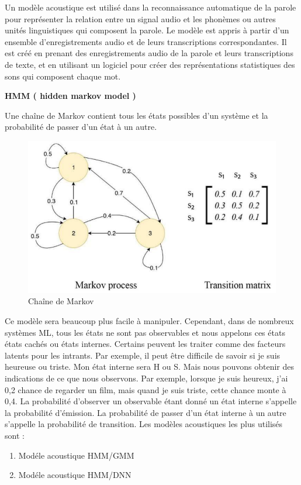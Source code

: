 \documentclass[a4paper, 12pt]{book}
\begin{document}
Un modèle acoustique est utilisé dans la reconnaissance automatique de la parole pour représenter la relation entre un signal audio et les phonèmes ou autres unités linguistiques qui composent la parole. Le modèle est appris à partir d'un ensemble d'enregistrements audio et de leurs transcriptions correspondantes. Il est créé en prenant des enregistrements audio de la parole et leurs transcriptions de texte, et en utilisant un logiciel pour créer des représentations statistiques des sons qui composent chaque mot.

\textbf{HMM ( hidden markov model )}

Une chaîne de Markov contient tous les états possibles d'un système et la probabilité de passer d'un état à un autre.

\begin{figure}[htbp]
  \centering
  \includegraphics[width=0.7\linewidth]{fig/markov.png}
  \caption{Chaîne de Markov}
\end{figure}


Ce modèle sera beaucoup plus facile à manipuler. Cependant, dans de nombreux systèmes ML, tous les états ne sont pas observables et nous appelons ces états états cachés ou états internes. Certains peuvent les traiter comme des facteurs latents pour les intrants. Par exemple, il peut être difficile de savoir si je suis heureuse ou triste. Mon état interne sera {H ou S}. Mais nous pouvons obtenir des indications de ce que nous observons. Par exemple, lorsque je suis heureux, j'ai 0,2 chance de regarder un film, mais quand je suis triste, cette chance monte à 0,4. La probabilité d'observer un observable étant donné un état interne s'appelle la probabilité d'émission. La probabilité de passer d'un état interne à un autre s'appelle la probabilité de transition. Les modèles acoustiques les plus utilisés sont :


\begin{enumerate}

\item Modéle acoustique HMM/GMM
\item Modéle acoustique HMM/DNN

\end{enumerate}
\end{document}
